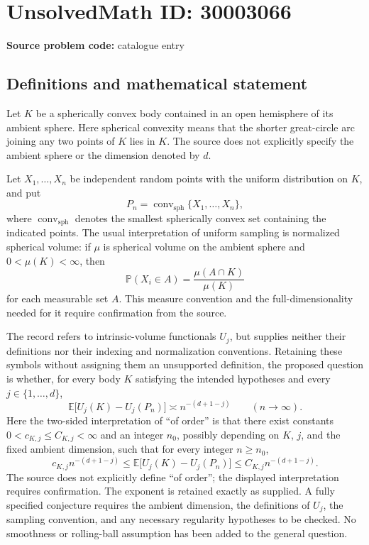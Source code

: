 \documentclass[11pt]{article}
\begin{document}
\section*{UnsolvedMath ID: 30003066}
\textbf{Source problem code:} catalogue entry
\subsection{Definitions and mathematical statement}
Let \(K\) be a spherically convex body contained in an open hemisphere of its ambient sphere. Here spherical convexity means that the shorter great-circle arc joining any two points of \(K\) lies in \(K\). The source does not explicitly specify the ambient sphere or the dimension denoted by \(d\).

Let \(X_1,\ldots,X_n\) be independent random points with the uniform distribution on \(K\), and put
\[
P_n=\operatorname{conv}_{\mathrm{sph}}\{X_1,\ldots,X_n\},
\]
where \(\operatorname{conv}_{\mathrm{sph}}\) denotes the smallest spherically convex set containing the indicated points. The usual interpretation of uniform sampling is normalized spherical volume: if \(\mu\) is spherical volume on the ambient sphere and \(0<\mu(K)<\infty\), then
\[
\mathbb P(X_i\in A)=\frac{\mu(A\cap K)}{\mu(K)}
\]
for each measurable set \(A\). This measure convention and the full-dimensionality needed for it require confirmation from the source.

The record refers to intrinsic-volume functionals \(U_j\), but supplies neither their definitions nor their indexing and normalization conventions. Retaining these symbols without assigning them an unsupported definition, the proposed question is whether, for every body \(K\) satisfying the intended hypotheses and every \(j\in\{1,\ldots,d\}\),
\[
\mathbb E\bigl[U_j(K)-U_j(P_n)\bigr]
\asymp n^{-(d+1-j)}\qquad(n\to\infty).
\]
Here the two-sided interpretation of ``of order'' is that there exist constants \(0<c_{K,j}\le C_{K,j}<\infty\) and an integer \(n_0\), possibly depending on \(K\), \(j\), and the fixed ambient dimension, such that for every integer \(n\ge n_0\),
\[
c_{K,j}n^{-(d+1-j)}
\le \mathbb E\bigl[U_j(K)-U_j(P_n)\bigr]
\le C_{K,j}n^{-(d+1-j)}.
\]
The source does not explicitly define ``of order''; the displayed interpretation requires confirmation. The exponent is retained exactly as supplied. A fully specified conjecture requires the ambient dimension, the definitions of \(U_j\), the sampling convention, and any necessary regularity hypotheses to be checked. No smoothness or rolling-ball assumption has been added to the general question.
\end{document}
